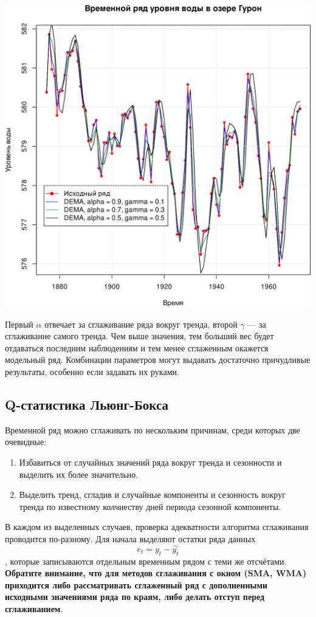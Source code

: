 \documentclass[
]{article}
\begin{document}
\begin{center}\includegraphics[width=0.6\linewidth]{Prac6_files/figure-latex/unnamed-chunk-14-1} \end{center}

Первый \(\alpha\) отвечает за сглаживание ряда вокруг тренда, второй
\(\gamma\) --- за сглаживание самого тренда. Чем выше значения, тем
больший вес будет отдаваться последним наблюдениям и тем менее
сглаженным окажется модельный ряд. Комбинации параметров могут выдавать
достаточно причудливые результаты, особенно если задавать их руками.

\hypertarget{q-ux441ux442ux430ux442ux438ux441ux442ux438ux43aux430-ux43bux44cux44eux43dux433-ux431ux43eux43aux441ux430}{%
\subsection{\texorpdfstring{\textbf{Q-статистика
Льюнг-Бокса}}{Q-статистика Льюнг-Бокса}}\label{q-ux441ux442ux430ux442ux438ux441ux442ux438ux43aux430-ux43bux44cux44eux43dux433-ux431ux43eux43aux441ux430}}

Временной ряд можно сглаживать по нескольким причинам, среди которых две
очевидные:

\begin{enumerate}
\def\labelenumi{\arabic{enumi}.}
\item
  Избавиться от случайных значений ряда вокруг тренда и сезонности и
  выделить их более значительно.
\item
  Выделить тренд, сгладив и случайные компоненты и сезонность вокруг
  тренда по известному колчиеству дней периода сезонной компоненты.
\end{enumerate}

В каждом из выделенных случаев, проверка адекватности алгоритма
сглаживания проводится по-разному. Для начала выделяют остатки ряда
данных \[e_t = y_t - \overset{\sim}{y_t}\], которые записываются
отдельным временным рядом с теми же отсчётами. \textbf{Обратите
внимание, что для методов сглаживания с окном (SMA, WMA) приходится либо
рассматривать сглаженный ряд с дополненными исходными значениями ряда по
краям, либо делать отступ перед сглаживанием}.
\end{document}
